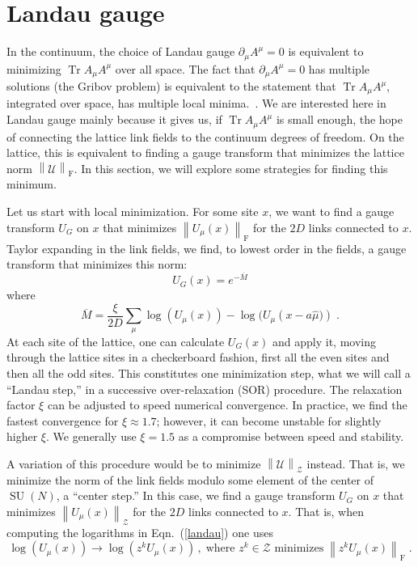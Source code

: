 \documentclass[preprint,aps,prd]{revtex4-2}
\newcommand{\be}{\begin{equation}}
\newcommand{\eq}{\end{equation}}
\newcommand{\zentrum}{\mathcal{Z}}       %
\newcommand{\config}{\mathcal{U}}
\newcommand{\orelax}{\xi}
\DeclareMathOperator{\SU}{SU}
\DeclareMathOperator{\Tr}{Tr}
\newcommand\fnorm[1]{\left\lVert #1 \right\rVert_\mathrm{F}}
\newcommand\znorm[1]{\left\lVert #1 \right\rVert_\zentrum}
\begin{document}
\section{Landau gauge}

In the continuum, the choice of Landau gauge $\partial_\mu A^\mu = 0$
is equivalent to minimizing $\Tr A_\mu A^\mu$ over all space.  The fact that
$\partial_\mu A^\mu = 0$ has multiple solutions (the Gribov problem) is
equivalent to the statement that $\Tr A_\mu A^\mu$, integrated over space,
has multiple local minima.~\cite{maas_more_2009}.
We are interested here in Landau gauge mainly
because it gives us, if $\Tr A_\mu A^\mu$ is small enough, the
hope of connecting the lattice
link fields to the continuum degrees of freedom.
On the lattice, this is equivalent to finding a gauge transform
that minimizes the lattice norm $\fnorm{\config}$.  In this
section, we will explore some strategies for finding this minimum.

Let us start with local minimization.
For some site $x$, we want to find a gauge transform $U_G$ on $x$
that minimizes $\fnorm{U_\mu(x)}$ for the $2D$
links connected to $x$.  Taylor expanding in the link fields,
we find, to lowest order in the fields, a gauge transform
that minimizes this norm:
%
\be
          U_G(x) = e^{- \overline{M}}
\eq
where
\be
   \overline{M} = \frac{\orelax}{2 D} \sum_\mu \log\left(U_\mu(x)\right) -
   \log(U_\mu\left(x-a \hat{\mu})\right)  \; . \label{landau}
\eq
%
At each site of the lattice, one can calculate $U_G(x)$ and apply it,
moving through the lattice sites in a checkerboard fashion,
first all the even sites and then all the odd sites.
This constitutes one minimization step, what we will call
a ``Landau step,'' in a successive over-relaxation (SOR) procedure.
The relaxation factor $\orelax$ can be adjusted to speed numerical
convergence.
In practice, we find the fastest convergence for $\orelax \approx 1.7$;
however, it can become unstable for slightly higher $\orelax$.
We generally use $\orelax=1.5$ as a compromise between speed and stability.

A variation of this procedure would be to minimize
$\znorm{\config}$ instead.
That is, we minimize the norm of the link
fields modulo some element of the center of $\SU(N)$, a ``center step.''
In this case, we find a gauge transform $U_G$ on $x$
that minimizes $\znorm{U_\mu(x)}$ for the $2D$
links connected to $x$.
That is, when computing the logarithms in Eqn.~(\ref{landau}) one uses
\be
\log\left(U_\mu(x)\right) \to \log\left(z^k U_\mu(x)\right)
\, , \;\mbox{
  where $z^k\in\zentrum$ minimizes}\; \fnorm{z^k U_\mu(x)} \;.
\eq
\end{document}
